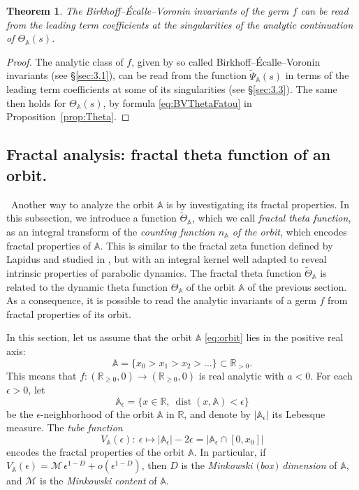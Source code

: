 \documentclass[a4paper,11pt]{amsart}
\numberwithin{equation}{section}
\newcommand{\R}{{\mathbb R}}
\newcommand{\orbit}{\mathbb{A}}
\newcommand{\dist}{\operatorname{dist}}
\newtheorem{thmx}{Theorem}\renewcommand{\thethmx}{\Alph{thmx}}
\theoremstyle{definition}
\begin{document}
\begin{thmx}\label{cor:1}
The Birkhoff--\'Ecalle--Voronin invariants of the germ $f$ 
can be read from the leading term coefficients at the singularities of the analytic continuation of $\Theta_\orbit(s)$.
\end{thmx}
\begin{proof} 
The analytic class of $f$, given by so called Birkhoff--\'Ecalle--Voronin invariants (see \S\ref{sec:3.1}),
can be read from the function $\tilde\Psi_\orbit(s)$ in terms of the leading term coefficients at some of its singularities (see \S\ref{sec:3.3}). The same then holds for $\Theta_\orbit(s)$, by formula \eqref{eq:BVThetaFatou} in Proposition~\ref{prop:Theta}. 
\end{proof}









\subsection{Fractal analysis: fractal theta function of an orbit.}\label{sub:fraan}\
Another way to analyze the orbit $\orbit$ is by investigating its fractal properties.
In this subsection,  we introduce a function $\tilde\Theta_\orbit$,
which we call \emph{fractal theta function}, as an integral transform of the \emph{counting function $n_\orbit$ of the orbit}, which encodes fractal properties of $\orbit$.
This is similar to the fractal zeta function defined by Lapidus \cite{LRZ, LapFr1} and studied in \cite{MRR}, but with an integral kernel well adapted to reveal intrinsic properties of parabolic dynamics.
The fractal theta function $\tilde\Theta_\orbit$ is related to the dynamic theta function $\Theta_\orbit$ of the orbit $\orbit$ of the previous section.
As a consequence, it is possible to read the analytic invariants of a germ $f$ from fractal properties of its orbit.
\smallskip


In this section, let us assume that the orbit $\orbit$ \eqref{eq:orbit} %
lies in the positive real axis:
\[\orbit=\{x_0>x_1>x_2>\ldots\}\subset\R_{>0}.\] 
This means that 
$f:(\R_{\geq 0},0)\to(\R_{\geq 0},0)$ is real analytic with $a<0$. 
For each $\epsilon>0$, let 
\[\orbit_{\epsilon}=\{x\in\R,\ \dist(x,\orbit)<\epsilon\}\]
be the $\epsilon$-neighborhood of the orbit $\orbit$ in $\R$,
and denote by $\big|\orbit_\epsilon\big|$ its Lebesque measure. 
The \emph{tube function}
\[V_\orbit(\epsilon): \ \epsilon\mapsto \big|\orbit_\epsilon\big|-2\epsilon=\big|\orbit_\epsilon\cap[0,x_0]\big|\]
encodes the fractal properties of the orbit $\orbit$.
In particular, if $V_\orbit(\epsilon)=\mathcal{M}\,\epsilon^{1-D}+o(\epsilon^{1-D})$, then $D$ is the \emph{Minkowski $($box$\,)$ dimension} of $\orbit$, and $\mathcal{M}$ is the \emph{Minkowski content} of $\orbit$.
\end{document}
